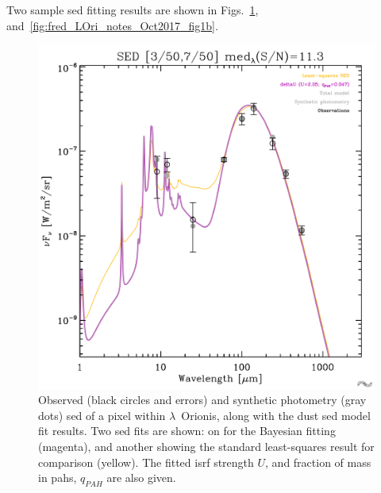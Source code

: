          Two sample \gls{sed} fitting results are shown in Figs.~\ref{fig:fred_LOri_notes_Oct2017_fig1a}, and~\ref{fig:fred_LOri_notes_Oct2017_fig1b}.
              \begin{figure}
                \includegraphics[width=\textwidth]{../Plots/ch_lori/fred_LOri_notes_Oct2017_fig1a.pdf}
                \centering
                \caption{Observed (black circles and errors) and synthetic photometry (gray dots) \gls{sed} of a pixel within $\lambda$~Orionis, along with the dust \gls{sed} model fit results. Two \gls{sed} fits are shown: on for the Bayesian fitting (magenta), and another showing the standard least-squares result for comparison (yellow). The fitted \gls{isrf} strength $U$, and fraction of mass in \gls{pah}s, $q_{PAH}$ are also given.}
                \label{fig:fred_LOri_notes_Oct2017_fig1a}
              \end{figure}
